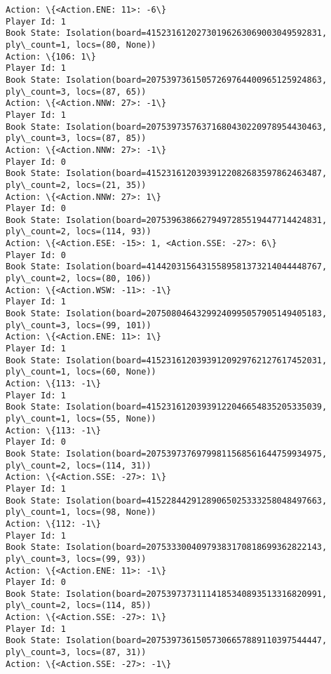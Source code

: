 \documentclass[11pt]{article}
\begin{document}
\begin{Verbatim}[commandchars=\\\{\}]
Action: \{<Action.ENE: 11>: -6\}
Player Id: 1
Book State: Isolation(board=41523161202730196263069003049592831, ply\_count=1, locs=(80, None))
Action: \{106: 1\}
Player Id: 1
Book State: Isolation(board=20753973615057269764400965125924863, ply\_count=3, locs=(87, 65))
Action: \{<Action.NNW: 27>: -1\}
Player Id: 1
Book State: Isolation(board=20753973576371680430220978954430463, ply\_count=3, locs=(87, 85))
Action: \{<Action.NNW: 27>: -1\}
Player Id: 0
Book State: Isolation(board=41523161203939122082683597862463487, ply\_count=2, locs=(21, 35))
Action: \{<Action.NNW: 27>: 1\}
Player Id: 0
Book State: Isolation(board=20753963866279497285519447714424831, ply\_count=2, locs=(114, 93))
Action: \{<Action.ESE: -15>: 1, <Action.SSE: -27>: 6\}
Player Id: 0
Book State: Isolation(board=41442031564315589581373214044448767, ply\_count=2, locs=(80, 106))
Action: \{<Action.WSW: -11>: -1\}
Player Id: 1
Book State: Isolation(board=20750804643299240995057905149405183, ply\_count=3, locs=(99, 101))
Action: \{<Action.ENE: 11>: 1\}
Player Id: 1
Book State: Isolation(board=41523161203939120929762127617452031, ply\_count=1, locs=(60, None))
Action: \{113: -1\}
Player Id: 1
Book State: Isolation(board=41523161203939122046654835205335039, ply\_count=1, locs=(55, None))
Action: \{113: -1\}
Player Id: 0
Book State: Isolation(board=20753973769799811568561644759934975, ply\_count=2, locs=(114, 31))
Action: \{<Action.SSE: -27>: 1\}
Player Id: 1
Book State: Isolation(board=41522844291289065025333258048497663, ply\_count=1, locs=(98, None))
Action: \{112: -1\}
Player Id: 1
Book State: Isolation(board=20753330040979383170818699362822143, ply\_count=3, locs=(99, 93))
Action: \{<Action.ENE: 11>: -1\}
Player Id: 0
Book State: Isolation(board=20753973731114185340893513316820991, ply\_count=2, locs=(114, 85))
Action: \{<Action.SSE: -27>: 1\}
Player Id: 1
Book State: Isolation(board=20753973615057306657889110397544447, ply\_count=3, locs=(87, 31))
Action: \{<Action.SSE: -27>: -1\}


\end{Verbatim}
\end{document}
